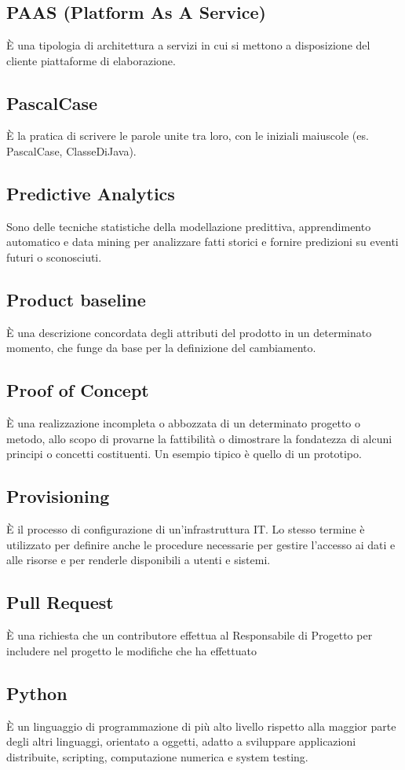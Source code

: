 \section{}
\subsection*{PAAS (Platform As A Service)} È una tipologia di architettura a servizi in cui si mettono a disposizione del cliente piattaforme di elaborazione.

\subsection*{PascalCase} È la pratica di scrivere le parole unite tra loro, con le iniziali maiuscole (es. PascalCase, ClasseDiJava).

\subsection*{Predictive Analytics} Sono delle tecniche statistiche della modellazione predittiva, apprendimento automatico e data mining per analizzare fatti storici e fornire predizioni su eventi futuri o sconosciuti.

\subsection*{Product baseline} È una descrizione concordata degli attributi del prodotto in un determinato momento, che funge da base per la definizione del cambiamento.

\subsection*{Proof of Concept} È una realizzazione incompleta o abbozzata di un determinato progetto o metodo, allo scopo di provarne la fattibilità o dimostrare la fondatezza di alcuni principi o concetti costituenti. Un esempio tipico è quello di un prototipo.

\subsection*{Provisioning} È il processo di configurazione di un'infrastruttura IT.
Lo stesso termine è utilizzato per definire anche le procedure necessarie per gestire l'accesso ai dati e alle risorse e per renderle disponibili a utenti e sistemi.

\subsection*{Pull Request} È una richiesta che un contributore effettua al Responsabile di Progetto per includere nel progetto le modifiche che ha effettuato

\subsection*{Python} È un linguaggio di programmazione di più alto livello rispetto alla maggior parte degli altri linguaggi, orientato a oggetti, adatto a sviluppare applicazioni distribuite, scripting, computazione numerica e system testing.
